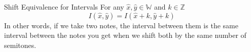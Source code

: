 \begin{theo*}{Shift Equivalence for Intervals}
  For any $ \widehat{x}, \widehat{y} \in \mathbb{W}$ and $k \in \mathbb{Z}$ 
  \[
  I\left( \widehat{x}, \widehat{y}\right) = I\left( \widehat{x}  +  k, \widehat{y}  +  k\right)
  \]
  In other words, if we take two notes, the interval between them is the same interval between the notes you get when we shift both by the same number of semitones.
\end{theo*}




